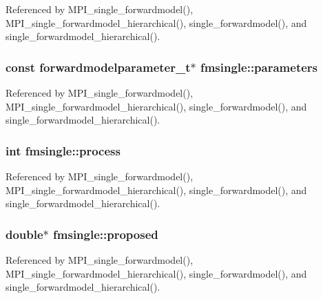 Referenced by M\+P\+I\+\_\+single\+\_\+forwardmodel(), M\+P\+I\+\_\+single\+\_\+forwardmodel\+\_\+hierarchical(), single\+\_\+forwardmodel(), and single\+\_\+forwardmodel\+\_\+hierarchical().

\subsubsection[{\texorpdfstring{parameters}{parameters}}]{\setlength{\rightskip}{0pt plus 5cm}const {\bf forwardmodelparameter\+\_\+t}$\ast$ fmsingle\+::parameters}\hypertarget{structfmsingle_afee4062457521ceedd7fef33d3384ce5}{}\label{structfmsingle_afee4062457521ceedd7fef33d3384ce5}


Referenced by M\+P\+I\+\_\+single\+\_\+forwardmodel(), M\+P\+I\+\_\+single\+\_\+forwardmodel\+\_\+hierarchical(), single\+\_\+forwardmodel(), and single\+\_\+forwardmodel\+\_\+hierarchical().

\subsubsection[{\texorpdfstring{process}{process}}]{\setlength{\rightskip}{0pt plus 5cm}int fmsingle\+::process}\hypertarget{structfmsingle_ad3fa1724fad1be77f25e08e3e740263b}{}\label{structfmsingle_ad3fa1724fad1be77f25e08e3e740263b}


Referenced by M\+P\+I\+\_\+single\+\_\+forwardmodel(), M\+P\+I\+\_\+single\+\_\+forwardmodel\+\_\+hierarchical(), single\+\_\+forwardmodel(), and single\+\_\+forwardmodel\+\_\+hierarchical().

\subsubsection[{\texorpdfstring{proposed}{proposed}}]{\setlength{\rightskip}{0pt plus 5cm}double$\ast$ fmsingle\+::proposed}\hypertarget{structfmsingle_a70956154a388f5de33b0e9e8ccc6f172}{}\label{structfmsingle_a70956154a388f5de33b0e9e8ccc6f172}


Referenced by M\+P\+I\+\_\+single\+\_\+forwardmodel(), M\+P\+I\+\_\+single\+\_\+forwardmodel\+\_\+hierarchical(), single\+\_\+forwardmodel(), and single\+\_\+forwardmodel\+\_\+hierarchical().

